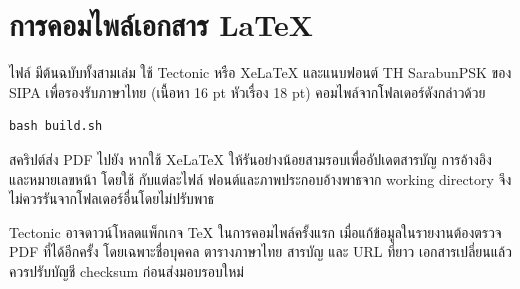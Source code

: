 \appendix
\renewcommand{\chaptername}{ภาคผนวก}
\chapter{การคอมไพล์เอกสาร LaTeX}
ไฟล์  มีต้นฉบับทั้งสามเล่ม ใช้ Tectonic หรือ XeLaTeX และแนบฟอนต์ TH SarabunPSK ของ SIPA เพื่อรองรับภาษาไทย (เนื้อหา 16 pt หัวเรื่อง 18 pt) คอมไพล์จากโฟลเดอร์ดังกล่าวด้วย
\begin{verbatim}
bash build.sh
\end{verbatim}
สคริปต์ส่ง PDF ไปยัง  หากใช้ XeLaTeX ให้รันอย่างน้อยสามรอบเพื่ออัปเดตสารบัญ การอ้างอิง และหมายเลขหน้า โดยใช้  กับแต่ละไฟล์ ฟอนต์และภาพประกอบอ้างพาธจาก working directory  จึงไม่ควรรันจากโฟลเดอร์อื่นโดยไม่ปรับพาธ

Tectonic อาจดาวน์โหลดแพ็กเกจ TeX ในการคอมไพล์ครั้งแรก เมื่อแก้ข้อมูลในรายงานต้องตรวจ PDF ที่ได้อีกครั้ง โดยเฉพาะชื่อบุคคล ตารางภาษาไทย สารบัญ และ URL ที่ยาว เอกสารเปลี่ยนแล้วควรปรับบัญชี checksum ก่อนส่งมอบรอบใหม่

